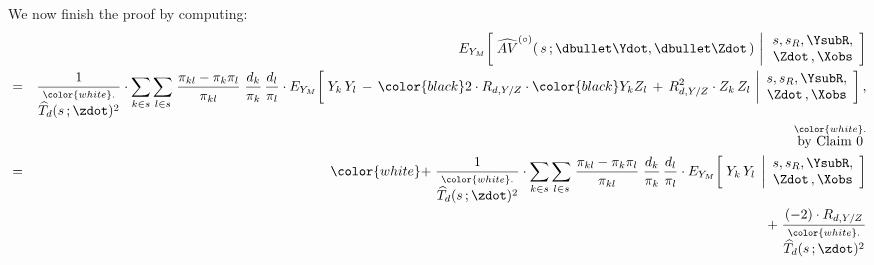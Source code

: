 \begin{enumerate}
    \vskip 0.5cm        
    \noindent
    We now finish the proof by computing:
    \begin{eqnarray*}
    &&
        E_{Y_{M}}\!\left[\;
            \widehat{AV}^{\textnormal{($\circ$)}}(\,s\,;\dbullet\Ydot,\dbullet\Zdot\,)
            \,\left\vert\,
            \begin{array}{c}
                s,s_{R},\YsubR, \\ \Zdot\,,\Xobs
                \end{array}
            \right.
            \!\right]
    \\
    & = &
        \dfrac{1}{
            \overset{{\color{white}.}}{
                \widehat{T}_{d}(s\,;\zdot)^{2}
                }
            }
        \cdot
        \underset{k \in s}{\sum}\,
        \underset{l \in s}{\sum}\;
        \dfrac{\pi_{kl} - \pi_{k}\pi_{l}}{\pi_{kl}}\;
        \dfrac{d_{k}}{\pi_{k}}\,
        \dfrac{d_{l}}{\pi_{l}}
        \cdot
        E_{Y_{M}}\!\left[\;
            Y_{k}\,Y_{l}
            \, - \,
            {\color{black}2}
            \cdot
            R_{d,Y/Z}
            \cdot
            {\color{black}Y_{k}Z_{l}}
            \, + \,
            R_{d,Y/Z}^{2}
            \cdot
            Z_{k}\,Z_{l}
            \,\left\vert
            \begin{array}{c}
                s,s_{R},\YsubR, \\ \Zdot\,,\Xobs
                \end{array}
            \right.
            \!\right],
    \\
    &&
        \quad
        \overset{{\color{white}.}}{\textnormal{by Claim 0}}
    \\
    & = &
        \; {\color{white}+} \;
        \dfrac{1}{
            \overset{{\color{white}.}}{\widehat{T}_{d}(s\,;\zdot)^{2}}
            }
        \cdot
        \underset{k \in s}{\sum}\,
        \underset{l \in s}{\sum}\;
        \dfrac{\pi_{kl} - \pi_{k}\pi_{l}}{\pi_{kl}}\;
        \dfrac{d_{k}}{\pi_{k}}\,
        \dfrac{d_{l}}{\pi_{l}}
        \cdot
        E_{Y_{M}}\!\left[\;
            Y_{k}\,Y_{l}
            \;\left\vert
            \begin{array}{c}
                s,s_{R},\YsubR, \\ \Zdot\,,\Xobs
                \end{array}
            \right.
            \!\right]
    \\
    &&
        \; + \;
        \dfrac{
            (-2) \cdot R_{d,Y/Z}
            }{
            \overset{{\color{white}.}}{\widehat{T}_{d}(s\,;\zdot)^{2}}
}
\end{eqnarray*}
\end{enumerate}

